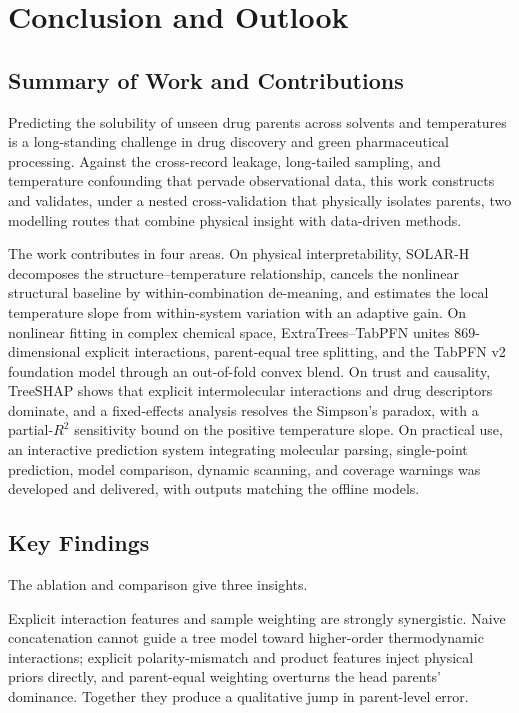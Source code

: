 \section{Conclusion and Outlook}

\subsection{Summary of Work and Contributions}

Predicting the solubility of unseen drug parents across solvents and temperatures is a long-standing challenge in drug discovery and green pharmaceutical processing. Against the cross-record leakage, long-tailed sampling, and temperature confounding that pervade observational data, this work constructs and validates, under a nested cross-validation that physically isolates parents, two modelling routes that combine physical insight with data-driven methods.

The work contributes in four areas. On physical interpretability, SOLAR-H decomposes the structure--temperature relationship, cancels the nonlinear structural baseline by within-combination de-meaning, and estimates the local temperature slope from within-system variation with an adaptive gain. On nonlinear fitting in complex chemical space, ExtraTrees--TabPFN unites 869-dimensional explicit interactions, parent-equal tree splitting, and the TabPFN v2 foundation model through an out-of-fold convex blend. On trust and causality, TreeSHAP shows that explicit intermolecular interactions and drug descriptors dominate, and a fixed-effects analysis resolves the Simpson's paradox, with a partial-$R^2$ sensitivity bound on the positive temperature slope. On practical use, an interactive prediction system integrating molecular parsing, single-point prediction, model comparison, dynamic scanning, and coverage warnings was developed and delivered, with outputs matching the offline models.

\subsection{Key Findings}

The ablation and comparison give three insights.

Explicit interaction features and sample weighting are strongly synergistic. Naive concatenation cannot guide a tree model toward higher-order thermodynamic interactions; explicit polarity-mismatch and product features inject physical priors directly, and parent-equal weighting overturns the head parents' dominance. Together they produce a qualitative jump in parent-level error.

